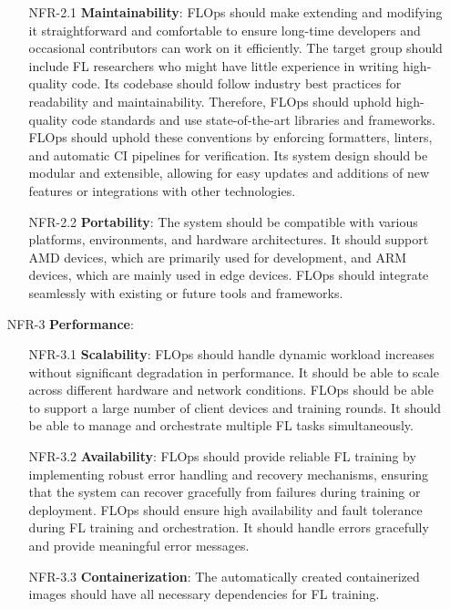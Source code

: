 \begin{itemize}
\begin{itemize}
        \item [NFR-2.1] {\textbf{Maintainability}}:
            FLOps should make extending and modifying it straightforward and comfortable to ensure long-time developers and occasional contributors can work on it efficiently.
            The target group should include FL researchers who might have little experience in writing high-quality code.
            Its codebase should follow industry best practices for readability and maintainability.
            Therefore, FLOps should uphold high-quality code standards and use state-of-the-art libraries and frameworks.
            FLOps should uphold these conventions by enforcing formatters, linters, and automatic CI pipelines for verification.
            Its system design should be modular and extensible, allowing for easy updates and additions of new features or integrations with other technologies.
        \item [NFR-2.2] {\textbf{Portability}}:
            The system should be compatible with various platforms, environments, and hardware architectures.
            It should support AMD devices, which are primarily used for development, and ARM devices, which are mainly used in edge devices.
            FLOps should integrate seamlessly with existing or future tools and frameworks.
        \end{itemize}
    \item [NFR-3] {\textbf{Performance}}:
        \begin{itemize}
        \item [NFR-3.1] {\textbf{Scalability}}:
            FLOps should handle dynamic workload increases without significant degradation in performance.
            It should be able to scale across different hardware and network conditions.
            FLOps should be able to support a large number of client devices and training rounds.
            It should be able to manage and orchestrate multiple FL tasks simultaneously.
        \item [NFR-3.2] {\textbf{Availability}}:
            FLOps should provide reliable FL training by implementing robust error handling and recovery mechanisms, ensuring that the system can recover gracefully from failures during training or deployment.
            FLOps should ensure high availability and fault tolerance during FL training and orchestration.
            It should handle errors gracefully and provide meaningful error messages.
        \item [NFR-3.3] {\textbf{Containerization}}:
            The automatically created containerized images should have all necessary dependencies for FL training.

\end{itemize}
\end{itemize}
